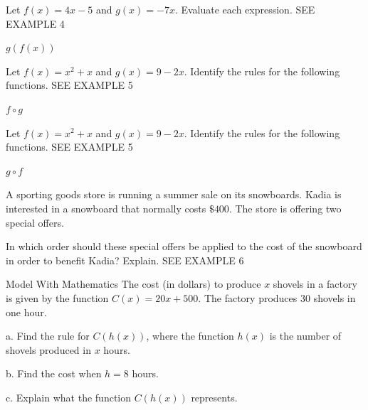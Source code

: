 \documentclass{article}
\newenvironment{practice}[2]{}{}        %
\newcommand{\answer}[1]{}               %
\newcommand{\placeholder}[2]{}          %
\begin{document}
\begin{practice}{27}{1}
Let \(f(x)=4x-5\) and \(g(x)=-7x\). Evaluate each expression. SEE EXAMPLE 4

\(g(f(x))\)

\answer{\(-28x+35\).}
\end{practice}

\begin{practice}{28}{1}
Let \(f(x)=x^2+x\) and \(g(x)=9-2x\). Identify the rules for the following functions. SEE EXAMPLE 5

\(f\circ g\)

\answer{\(4x^2-38x+90\).}
\end{practice}

\begin{practice}{29}{1}
Let \(f(x)=x^2+x\) and \(g(x)=9-2x\). Identify the rules for the following functions. SEE EXAMPLE 5

\(g\circ f\)

\answer{\(-2x^2-2x+9\).}
\end{practice}

\begin{practice}{30}{2}
A sporting goods store is running a summer sale on its snowboards. Kadia is interested in a snowboard that normally costs \(\$400\). The store is offering two special offers.

\placeholder{illustration}{Snowboards in a store with two circular labels: ``\$50 INSTANT REBATE'' and ``10\% DISCOUNT.''}

In which order should these special offers be applied to the cost of the snowboard in order to benefit Kadia? Explain. SEE EXAMPLE 6

\answer{It is better for Kadia if the \(10\%\) discount is applied before the \(\$50\) instant rebate because he will save \(\$5\) more.}
\end{practice}

\begin{practice}{31}{2}
Model With Mathematics The cost (in dollars) to produce \(x\) shovels in a factory is given by the function \(C(x)=20x+500\). The factory produces 30 shovels in one hour.

a. Find the rule for \(C(h(x))\), where the function \(h(x)\) is the number of shovels produced in \(x\) hours.

b. Find the cost when \(h=8\) hours.

c. Explain what the function \(C(h(x))\) represents.

\answer{a. \(C(h(x))=600x+500\). b. \(\$5{,}300\). c. \(C(h(x))\) represents the cost to produce \(x\) hours' worth of shovels.}
\end{practice}
\end{document}
